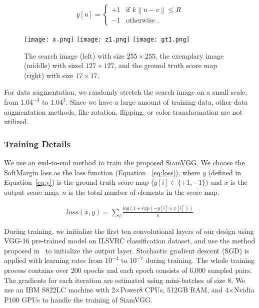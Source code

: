 \documentclass[runningheads]{llncs}
\begin{document}
\begin{align}\label{eq:y}
y[u] = \left\{\begin{matrix}
+1 & \text{if }k\left \| u - c \right \|\leq R\\ 
-1 & \text{otherwise }.
\end{matrix}\right.
\end{align}



\begin{figure}
\centering
\texttt{[image: x.png]}\hfill
\texttt{[image: z1.png]}\hfill
\texttt{[image: gt1.png]}
\caption{The search image (left) with size  $255 \times 255$, the exemplary image (middle) with sized $127 \times 127$, and the ground truth score map (right) with size $17 \times 17$.}
\label{fig:xzgt_example}
\end{figure}


For data augmentation, we randomly stretch the search image on a small scale, from $1.04^{-3}$ to $1.04^3$. Since we have a large amount of training data, other data augmentation methods, like rotation, flipping, or color transformation are not utilized.

\subsubsection{Training Details}

We use an end-to-end method to train the proposed SiamVGG. We choose the SoftMargin loss as the loss function (Equation ~\ref{eq:loss}), where $y$ (defined in Equation~\ref{eq:y}) is the ground truth score map ($y[i] \in \{+1, -1\}$) and $x$ is the output score map. $n$ is the total number of elements in the score map.

\begin{align}\label{eq:loss}
    loss(x,y) = \sum_{i}\frac{log(1 + exp(-y[i] \times x[i]))}{n}
\end{align}


During training, we initialize the first ten convolutional layers of our design using VGG-16 pre-trained model on ILSVRC classification dataset, and use the method proposed in~\cite{he2015delving} to initialize the output layer. Stochastic gradient descent (SGD) is applied with learning rates from $10^{-4}$ to $10^{-7}$ during training. The whole training process contains over 200 epochs and each epoch consists of 6,000 sampled pairs. The gradients for each iteration are estimated using mini-batches of size 8. We use an IBM S822LC machine with 2$\times$Power8 CPUs, 512GB RAM, and 4$\times$Nvidia P100 GPUs to handle the training of SiamVGG.
\end{document}
